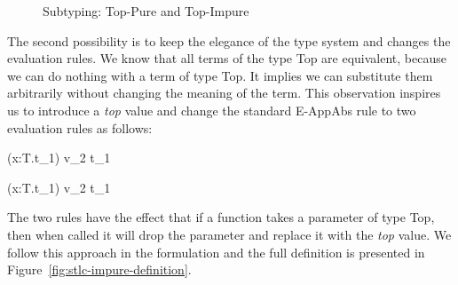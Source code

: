 \begin{figure}
\centering


\caption{Subtyping: Top-Pure and Top-Impure}
\label{fig:stlc-impure-subtyping-tree}
\end{figure}

The second possibility is to keep the elegance of the type system and
changes the evaluation rules. We know that all terms of the type Top
are equivalent, because we can do nothing with a term of type Top. It
implies we can substitute them arbitrarily without changing the
meaning of the term. This observation inspires us to introduce a
\emph{top} value and change the standard E-AppAbs rule to two
evaluation rules as follows:

{ (\lambda x:T.t_1) v_2 \longrightarrow [x \mapsto v_2]t_1 }

{ (\lambda x:T.t_1) v_2 t_1 }

The two rules have the effect that if a function takes a parameter of
type Top, then when called it will drop the parameter and replace it
with the \emph{top} value. We follow this approach in the formulation
and the full definition is presented in
Figure~\ref{fig:stlc-impure-definition}.

